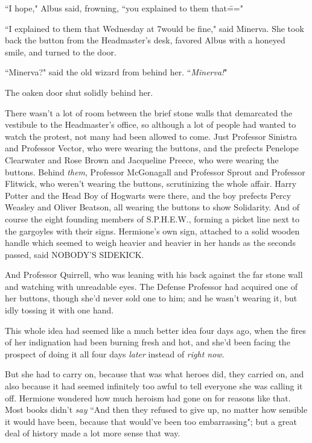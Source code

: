 ``I hope," Albus said, frowning, ``you explained to them that\==="

``I explained to them that Wednesday at 7\pm would be fine," said Minerva. She took back the button from the Headmaster's desk, favored Albus with a honeyed smile, and turned to the door.

``Minerva?" said the old wizard from behind her. ``\emph{Minerva!}"

The oaken door shut solidly behind her.

\later

There wasn't a lot of room between the brief stone walls that demarcated the vestibule to the Headmaster's office, so although a lot of people had wanted to watch the protest, not many had been allowed to come. Just Professor Sinistra and Professor Vector, who were wearing the buttons, and the prefects Penelope Clearwater and Rose Brown and Jacqueline Preece, who were wearing the buttons. Behind \emph{them}, Professor McGonagall and Professor Sprout and Professor Flitwick, who weren't wearing the buttons, scrutinizing the whole affair. Harry Potter and the Head Boy of Hogwarts were there, and the boy prefects Percy Weasley and Oliver Beatson, all wearing the buttons to show Solidarity. And of course the eight founding members of S.P.H.E.W., forming a picket line next to the gargoyles with their signs. Hermione's own sign, attached to a solid wooden handle which seemed to weigh heavier and heavier in her hands as the seconds passed, said NOBODY'S SIDEKICK.

And Professor Quirrell, who was leaning with his back against the far stone wall and watching with unreadable eyes. The Defense Professor had acquired one of her buttons, though she'd never sold one to him; and he wasn't wearing it, but idly tossing it with one hand.

This whole idea had seemed like a much better idea four days ago, when the fires of her indignation had been burning fresh and hot, and she'd been facing the prospect of doing it all four days \emph{later} instead of \emph{right now}.

But she had to carry on, because that was what heroes did, they carried on, and also because it had seemed infinitely too awful to tell everyone she was calling it off. Hermione wondered how much heroism had gone on for reasons like that. Most books didn't \emph{say} ``And then they refused to give up, no matter how sensible it would have been, because that would've been too embarrassing"; but a great deal of history made a lot more sense that way.

